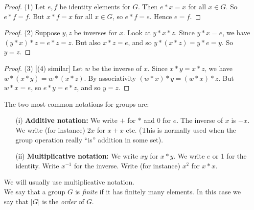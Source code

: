 \documentclass[twoside]{scrartcl}
\begin{document}
\begin{proof} (1)     
 Let $e,f$ be identity elements for $G$. Then $e*x = x$ for all $x \in G$.  So $e*f = f$. But $x*f = x$ for all $x \in G$, so $e*f = e$. Hence $e = f$.
\end{proof}

\begin{proof} (2) Suppose $y, z$ be inverses for $x$. Look at $y*x*z$. Since $y*x = e$, we have $(y*x)*z = e*z = z$. But also $x*z = e$, and so $y*(x*z) = y*e = y$. So $y = z$.
\end{proof}

\begin{proof} (3) [(4) similar] Let $w$ be the inverse of $x$. Since $x*y = x*z$, we have $w*(x*y) = w*(x*z)$. By associativity $(w*x)*y = (w*x)*z$. But $w*x = e$, so $e*y = e*z$, and so $y = z$.
\end{proof} \vspace*{10pt}


The two most common notations for groups are:\begin{enumerate}
\item[(i)] \textbf{Additive notation:} We write $+$ for $*$ and 0 for $e$. The inverse of $x$ is $-x$. We write (for instance) $2x$ for $x+x$ etc. (This is normally used when the group operation really ``is'' addition in some set).
\item[(ii)] \textbf{Multiplicative notation:} We write $xy$ for $x*y$. We write $e$ or 1 for the identity. Write $x^{-1}$ for the inverse. Write (for instance) $x^2$ for $x*x$.
\end{enumerate}

We will usually use multiplicative notation.\\

We say that a group $G$ is \emph{finite} if it has finitely many elements. In this case we say that $|G|$ is the \emph{order} of $G$.\\
\end{document}
